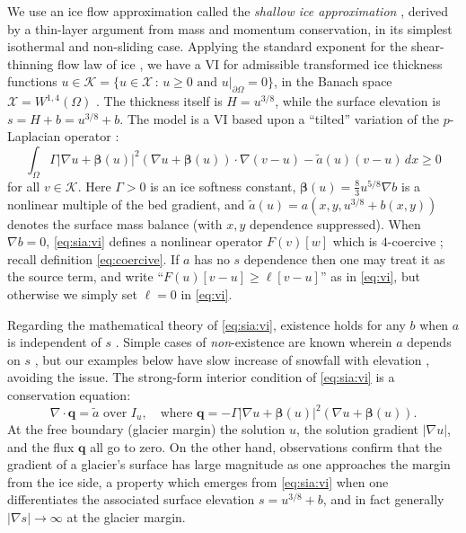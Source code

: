 \documentclass[]{interact}
\theoremstyle{plain}%
\theoremstyle{definition}
\theoremstyle{remark}
\newcommand{\grad}{\nabla}
\newcommand{\Div}{\nabla\cdot}
\newcommand{\bq}{\mathbf{q}}
\newcommand{\cK}{\mathcal{K}}
\newcommand{\cX}{\mathcal{X}}
\begin{document}
We use an ice flow approximation called the \emph{shallow ice approximation} \cite{GreveBlatter2009}, derived by a thin-layer argument from mass and momentum conservation, in its simplest isothermal and non-sliding case.  Applying the standard exponent for the shear-thinning flow law of ice \cite{GreveBlatter2009}, we have a VI for admissible transformed ice thickness functions $u \in \cK = \{u \in \cX\,:\,u\ge 0 \text{ and } u|_{\partial\Omega}=0\}$, in the Banach space $\cX = W^{1,4}(\Omega)$ \cite{JouvetBueler2012}.  The thickness itself is $H=u^{3/8}$, while the surface elevation is $s=H+b=u^{3/8}+b$.  The model is a VI based upon a ``tilted'' variation of the $p$-Laplacian operator \cite{JouvetBueler2012}:
\begin{equation}
\int_\Omega \Gamma |\grad u + \bm{\beta}(u)|^2 (\grad u + \bm{\beta}(u)) \cdot \grad (v-u) - \tilde a(u) (v-u)\,dx \ge 0 \label{eq:sia:vi}
\end{equation}
for all $v \in \cK$.  Here $\Gamma>0$ is an ice softness constant, $\bm{\beta}(u)=\frac{8}{3} u^{5/8} \grad b$ is a nonlinear multiple of the bed gradient, and $\tilde a(u)=a(x,y,u^{3/8}+b(x,y))$ denotes the surface mass balance (with $x,y$ dependence suppressed).  When $\grad b=0$, \eqref{eq:sia:vi} defines a nonlinear operator $F(v)[w]$ which is $4$-coercive \cite{JouvetBueler2012}; recall definition \eqref{eq:coercive}.  If $a$ has no $s$ dependence then one may treat it as the source term, and write ``$F(u)[v-u]\ge\ell[v-u]$'' as in \eqref{eq:vi}, but otherwise we simply set $\ell=0$ in \eqref{eq:vi}.

Regarding the mathematical theory of \eqref{eq:sia:vi}, existence holds for any $b$ when $a$ is independent of $s$ \cite{JouvetBueler2012}.  Simple cases of \emph{non}-existence are known wherein $a$ depends on $s$ \cite{Jouvetetal2011}, but our examples below have slow increase of snowfall with elevation \cite{GreveBlatter2009}, avoiding the issue.  The strong-form interior condition of \eqref{eq:sia:vi} is a conservation equation:
\begin{equation}
\Div \bq = \tilde a \text{ over } I_u, \quad \text{where } \bq = - \Gamma |\grad u + \bm{\beta}(u)|^2 (\grad u + \bm{\beta}(u)).
\label{eq:sia:interior}
\end{equation}
At the free boundary (glacier margin) the solution $u$, the solution gradient $|\grad u|$, and the flux $\bq$ all go to zero.  On the other hand, observations confirm that the gradient of a glacier's surface has large magnitude as one approaches the margin from the ice side, a property which emerges from \eqref{eq:sia:vi} when one differentiates the associated surface elevation $s=u^{3/8} + b$, and in fact generally $|\grad s| \to \infty$ at the glacier margin.
\end{document}
